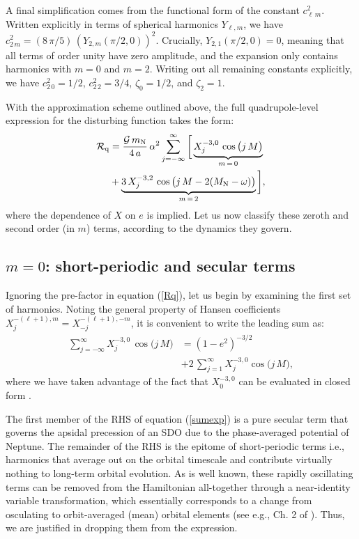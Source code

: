 \documentclass[twocolumn]{aastex62}
\newcommand{\G}{\mathcal{G}}
\newcommand{\R}{\mathcal{R}}
\newcommand{\mn}{m_{\rm{N}}}
\newcommand{\Mn}{M_{\rm{N}}}
\begin{document}
A final simplification comes from the functional form of the constant $c_{\ell\,m}^2$. Written explicitly in terms of spherical harmonics $Y_{\ell,m}$, we have $c_{2\,m}^2=(8\,\pi/5)\,(Y_{2,m}(\pi/2,0))^2$. Crucially, $Y_{2,1}(\pi/2,0)=0$, meaning that all terms of order unity have zero amplitude, and the expansion only contains harmonics with $m=0$ and $m=2$. Writing out all remaining constants explicitly, we have $c_{2\,0}^2 = 1/2$, $c_{2\,2}^2 = 3/4$, $\zeta_0=1/2$, and $\zeta_2=1$. 

With the approximation scheme outlined above, the full quadrupole-level expression for the disturbing function takes the form:
\begin{align}
\R_{\rm{q}}&=\frac{\G\,\mn}{4\,a}\, \alpha^2  \sum_{j = -\infty}^{\infty} \bigg[\underbrace{X_{j}^{-3,0}\, \cos\big(j\,M\big)}_{m\,=\,0} \nonumber \\
&+ \underbrace{3\,X_{j}^{-3,2}\, \cos\big(j\,M- 2(\Mn-\omega)\big)}_{m\,=\,2} \bigg],
\label{Rq}
\end{align}
where the dependence of $X$ on $e$ is implied. Let us now classify these zeroth and second order (in $m$) terms, according to the dynamics they govern.

\subsection{$m=0$: short-periodic and secular terms}
Ignoring the pre-factor in equation (\ref{Rq}), let us begin by examining the first set of harmonics. Noting the general property of Hansen coefficients $X_{j}^{-(\ell+1),m}=X_{-j}^{-(\ell+1),-m}$, it is convenient to write the leading sum as:
\begin{align}
\sum_{j = -\infty}^{\infty} X_{j}^{-3,0}\, \cos\big(j\,M\big) &= (1-e^2)^{-3/2} \nonumber \\
&+2\,\sum_{j = 1}^{\infty} X_{j}^{-3,0} \cos\big(j\,M\big),
\label{sumexp}
\end{align}
where we have taken advantage of the fact that $X_{0}^{-3,0}$ can be evaluated in closed form \citep{1981CeMec..25..101H}.

The first member of the RHS of equation (\ref{sumexp}) is a pure secular term that governs the apsidal precession of an SDO due to the phase-averaged potential of Neptune. The remainder of the RHS is the epitome of short-periodic terms i.e., harmonics that average out on the orbital timescale and contribute virtually nothing to long-term orbital evolution. As is well known, these rapidly oscillating terms can be removed from the Hamiltonian all-together through a near-identity variable transformation, which essentially corresponds to a change from osculating to orbit-averaged (mean) orbital elements (see e.g., Ch. 2 of \citealt{Morbybook}). Thus, we are justified in dropping them from the expression.
\end{document}
